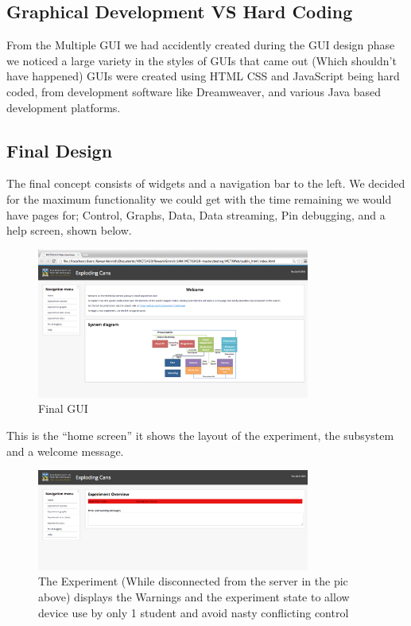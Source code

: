 \subsection{Graphical Development VS Hard Coding}

From the Multiple GUI we had accidently created during the GUI design phase we noticed a large variety in the styles of GUIs that came out (Which shouldn't have happened) GUIs were created using HTML CSS and JavaScript being hard coded, from development software like Dreamweaver, and various Java based development platforms. 

\subsection{Final Design}

The final concept consists of widgets and a navigation bar to the left. We decided for the maximum functionality we could get with the time remaining we would have pages for; Control, Graphs, Data, Data streaming,  Pin debugging, and a help screen, shown below.

\begin{figure}[H]
	\centering
	\includegraphics[width=0.8\textwidth]{figures/GUI_final.png}
	\caption{Final GUI} 
\end{figure}

This is the ``home screen'' it shows the layout of the experiment, the subsystem and a welcome message.

\begin{figure}[H]
	\centering
	\includegraphics[width=0.8\textwidth]{figures/GUI_experiment.png}
	\caption{The Experiment (While disconnected from the server in the pic above) displays the Warnings and the experiment state to allow device use by only 1 student and avoid nasty conflicting control} 
\end{figure}

